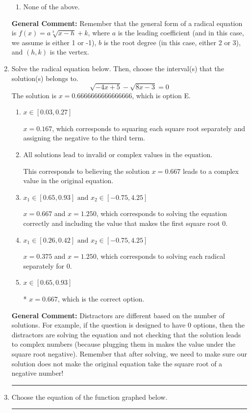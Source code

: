 \documentclass{extbook}[14pt]
\newcommand{\litem}[1]{\item #1

\rule{\textwidth}{0.4pt}}
\begin{document}
\begin{enumerate}
{\begin{enumerate}[label=\Alph*.]
\item None of the above.\end{enumerate}
\textbf{General Comment:} Remember that the general form of a radical equation is $ f(x) = a \sqrt[b]{x - h} + k $, where $a$ is the leading coefficient (and in this case, we assume is either 1 or -1), $b$ is the root degree (in this case, either 2 or 3), and $(h, k)$ is the vertex.
}
\litem{
Solve the radical equation below. Then, choose the interval(s) that the solution(s) belongs to.
\[ \sqrt{-4 x + 5} - \sqrt{8 x - 3} = 0 \]The solution is \( x = 0.6666666666666666 \), which is option E.\begin{enumerate}[label=\Alph*.]
\item \( x \in [0.03,0.27] \)

$x = 0.167$, which corresponds to squaring each square root separately and assigning the negative to the third term.
\item \( \text{All solutions lead to invalid or complex values in the equation.} \)

This corresponds to believing the solution $x = 0.667$ leads to a complex value in the original equation.
\item \( x_1 \in [0.65, 0.93] \text{ and } x_2 \in [-0.75,4.25] \)

$x = 0.667$ and $x = 1.250$, which corresponds to solving the equation correctly and including the value that makes the first square root 0.
\item \( x_1 \in [0.26, 0.42] \text{ and } x_2 \in [-0.75,4.25] \)

$x = 0.375$ and $x = 1.250$, which corresponds to solving each radical separately for 0.
\item \( x \in [0.65,0.93] \)

* $x = 0.667$, which is the correct option.
\end{enumerate}

\textbf{General Comment:} Distractors are different based on the number of solutions. For example, if the question is designed to have 0 options, then the distractors are solving the equation and not checking that the solution leads to complex numbers (because plugging them in makes the value under the square root negative). Remember that after solving, we need to make sure our solution does not make the original equation take the square root of a negative number!
}
\litem{
Choose the equation of the function graphed below.

}
\end{enumerate}
\end{document}
